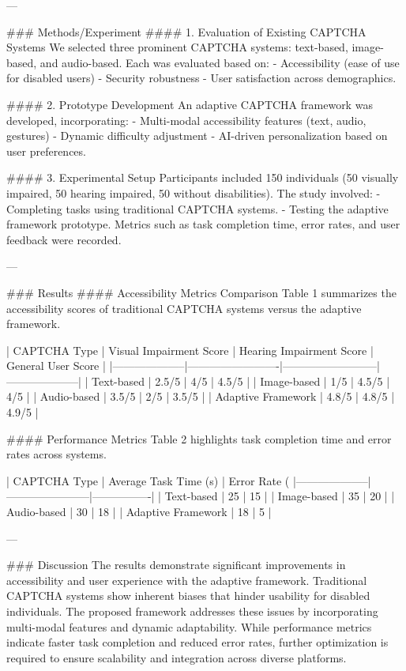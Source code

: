 ---

### Methods/Experiment
#### 1. Evaluation of Existing CAPTCHA Systems
We selected three prominent CAPTCHA systems: text-based, image-based, and audio-based. Each was evaluated based on:
- Accessibility (ease of use for disabled users)
- Security robustness
- User satisfaction across demographics.

#### 2. Prototype Development
An adaptive CAPTCHA framework was developed, incorporating:
- Multi-modal accessibility features (text, audio, gestures)
- Dynamic difficulty adjustment
- AI-driven personalization based on user preferences.

#### 3. Experimental Setup
Participants included 150 individuals (50 visually impaired, 50 hearing impaired, 50 without disabilities). The study involved:
- Completing tasks using traditional CAPTCHA systems.
- Testing the adaptive framework prototype.
Metrics such as task completion time, error rates, and user feedback were recorded.

---

### Results
#### Accessibility Metrics Comparison
Table 1 summarizes the accessibility scores of traditional CAPTCHA systems versus the adaptive framework.

| CAPTCHA Type       | Visual Impairment Score | Hearing Impairment Score | General User Score |
|--------------------|-------------------------|--------------------------|--------------------|
| Text-based         | 2.5/5                  | 4/5                      | 4.5/5             |
| Image-based        | 1/5                    | 4.5/5                    | 4/5               |
| Audio-based        | 3.5/5                  | 2/5                      | 3.5/5             |
| Adaptive Framework | 4.8/5                  | 4.8/5                    | 4.9/5             |

#### Performance Metrics
Table 2 highlights task completion time and error rates across systems.

| CAPTCHA Type       | Average Task Time (s) | Error Rate (%
|--------------------|-----------------------|----------------|
| Text-based         | 25                   | 15             |
| Image-based        | 35                   | 20             |
| Audio-based        | 30                   | 18             |
| Adaptive Framework | 18                   | 5              |

---

### Discussion
The results demonstrate significant improvements in accessibility and user experience with the adaptive framework. Traditional CAPTCHA systems show inherent biases that hinder usability for disabled individuals. The proposed framework addresses these issues by incorporating multi-modal features and dynamic adaptability. While performance metrics indicate faster task completion and reduced error rates, further optimization is required to ensure scalability and integration across diverse platforms.

